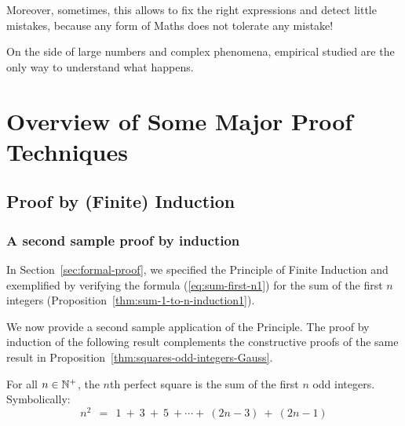 Moreover, sometimes, this allows to fix the right expressions  and detect little mistakes, because any form of Maths does not tolerate any mistake!

On the side of large numbers and complex phenomena, empirical studied are the only way to understand what happens. 

\section{Overview of Some Major Proof Techniques}
\label{sec:major-proof-techniques}

\subsection{Proof by (Finite) Induction}
\label{sec:Induction}

\subsubsection{A second sample proof by induction}

In Section~\ref{sec:formal-proof}, we specified the Principle of
Finite Induction  and
exemplified by verifying the formula (\ref{eq:sum-first-n1}) for the
sum of the first $n$ integers
(Proposition~\ref{thm:sum-1-to-n-induction1}).

We now provide a second sample application of the Principle.  The
proof by induction of the following result complements the
constructive proofs of the same result in
Proposition~\ref{thm:squares-odd-integers-Gauss}.

\begin{prop}
\label{thm:squares-odd-integers-induction1}
For all $n \in \mathbb{N}^+$, the $n$th perfect square is the sum of the first
$n$ odd integers.  Symbolically:
\[
n^2 \ \ = \ \
1 \ + \ 3 \ + \ 5 \ + \cdots + \ (2n-3) \ + \ (2n-1)
\]
\end{prop}

